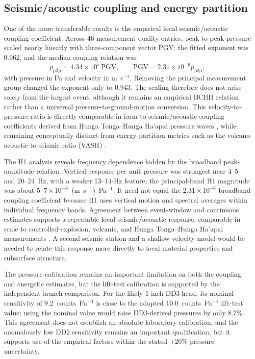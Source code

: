 \documentclass[]{seismica}
\begin{document}
\subsection{Seismic/acoustic coupling and energy partition}

One of the more transferable results is the empirical local
seismic/acoustic coupling coefficient. Across 46 measurement-quality entries,
peak-to-peak pressure scaled nearly linearly with three-component vector PGV:
the fitted exponent was 0.962, and the median coupling relation was
\[
 p_{\mathrm{p2p}}=4.34\times10^5\,\mathrm{PGV},
 \qquad
 \mathrm{PGV}=2.31\times10^{-6}p_{\mathrm{p2p}},
\]
with pressure in Pa and velocity in m~s$^{-1}$. Removing the principal
measurement group changed the exponent only to 0.943. The scaling therefore
does not arise solely from the largest event, although it remains an empirical
BCHH relation rather than a universal pressure-to-ground-motion conversion.
This velocity-to-pressure ratio is directly comparable in form to
seismic/acoustic coupling coefficients derived from Hunga Tonga--Hunga Ha'apai
pressure waves
\citep{anthony_hunga_coupling_2023,macpherson_hunga_coupling_2025}, while
remaining conceptually distinct from energy-partition metrics such as the
volcano acoustic-to-seismic ratio (VASR) \citep{johnson_aster_2005}.

The H1 analysis reveals frequency dependence hidden by the broadband
peak-amplitude relation. Vertical response per unit pressure was strongest near
4--5 and 20--24~Hz, with a weaker 13--14-Hz feature; the principal-band H1
magnitude was about
$5$--$7\times10^{-6}$~(m~s$^{-1}$)~Pa$^{-1}$. It need not equal the
$2.31\times10^{-6}$ broadband coupling coefficient because H1 uses vertical
motion and spectral averages within individual frequency bands. Agreement
between event-window and continuous estimates supports a repeatable local
seismic/acoustic response, comparable in scale to controlled-explosion,
volcanic, and Hunga Tonga--Hunga Ha'apai measurements
\citep{novoselov_ground_coupling_2020,anthony_hunga_coupling_2023,
macpherson_hunga_coupling_2025}. A second seismic station and a shallow
velocity model would be needed to relate this response more directly to local
material properties and subsurface structure.

The pressure calibration remains an important limitation on both the
coupling and energetic estimates, but the lift-test calibration is supported
by the independent launch comparison. For the likely 1-inch DD3 head, its
nominal sensitivity of 9.2~counts~Pa$^{-1}$ is close to the adopted
10.0~counts~Pa$^{-1}$ lift-test value: using the nominal value would raise
DD3-derived pressures by only 8.7\%. This agreement does not establish an
absolute laboratory calibration, and the anomalously low DD2 sensitivity
remains an important qualification, but it supports use of the empirical
factors within the stated $\pm20\%$ pressure uncertainty.
\end{document}
